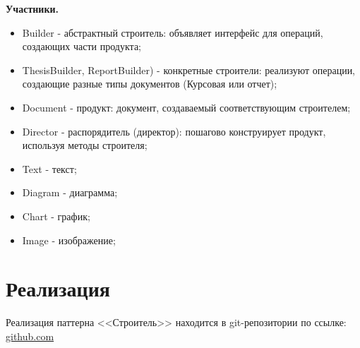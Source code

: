 \documentclass[PI,LAB]{HSEUniversity}
\begin{document}
\textbf{Участники.}
\begin{itemize}
  \item Builder - абстрактный строитель: объявляет интерфейс для операций, создающих части продукта;
  \item ThesisBuilder, ReportBuilder) - конкретные строители: реализуют операции, создающие разные типы документов (Курсовая или отчет);
  \item Document - продукт: документ, создаваемый соответствующим строителем;
  \item Director - распорядитель (директор): пошагово конструирует продукт, используя методы строителя;
  \item Text - текст;
  \item Diagram - диаграмма;
  \item Chart - график;
  \item Image - изображение;
\end{itemize}

\section{Реализация}
Реализация паттерна <<Строитель>> находится в git-репозитории по ссылке: \href{https://github.com/rovany706/design-patterns/tree/master/Builder/src/com/Builder}{github.com}
\end{document}
